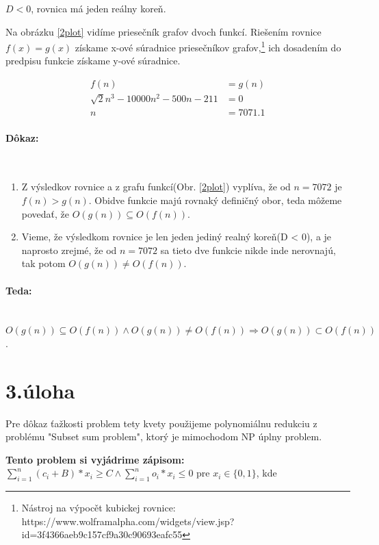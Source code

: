 \documentclass[11pt,a4paper]{article}
\begin{document}
$D < 0$, rovnica má jeden reálny koreň.

Na obrázku \ref{2plot} vidíme priesečník grafov dvoch funkcí. Riešením rovnice $ f(x) = g(x) $ získame x-ové súradnice priesečníkov grafov,\footnote{Nástroj na výpocět kubickej rovnice: https://www.wolframalpha.com/widgets/view.jsp?id=3f4366aeb9c157cf9a30c90693eafc55} ich dosadením do predpisu funkcie získame y-ové súradnice.

\label{2equation}
\begin{align*}
    f(n) & = g(n) \\
   \sqrt{2} n^3 - 10000n^2 -500n -211 & = 0 \\
    n & = 7071.1
\end{align*}

\newpage
\paragraph{Dôkaz:}\mbox{{}}\\
\begin{enumerate}
    \item Z výsledkov rovnice a z grafu funkcí(Obr. \ref{2plot}) vyplíva, že od $n = 7072$ je $ f(n) > g(n)$. Obidve funkcie majú rovnaký definičný obor, teda môžeme povedať, že $ O(g(n)) \subseteq O(f(n)) $.

    \item Vieme, že výsledkom rovnice je len jeden jediný realný koreň(D < 0), a je naprosto zrejmé, že od $ n = 7072 $ sa tieto dve funkcie nikde inde nerovnajú, tak potom $ O(g(n)) \neq O(f(n)) $.
\end{enumerate}

\paragraph{Teda:}\mbox{{}}\\
$ O(g(n)) \subseteq O(f(n)) \land O(g(n)) \neq O(f(n)) \Rightarrow O(g(n)) \subset O(f(n)) $.


\newpage
\section{3.úloha}
Pre dôkaz ťažkosti problem tety kvety použijeme polynomiálnu redukciu z problému "Subset sum problem", ktorý je mimochodom NP úplny problem.

\textbf{Tento problem si vyjádrime zápisom: } \\

$\sum\limits_{i=1}^{n} (c_i + B) * x_i \geq C \land \sum\limits_{i=1}^{n} o_i * x_i \leq 0 $ pre $  x_i \in \{0, 1\} $, kde \\
\end{document}
